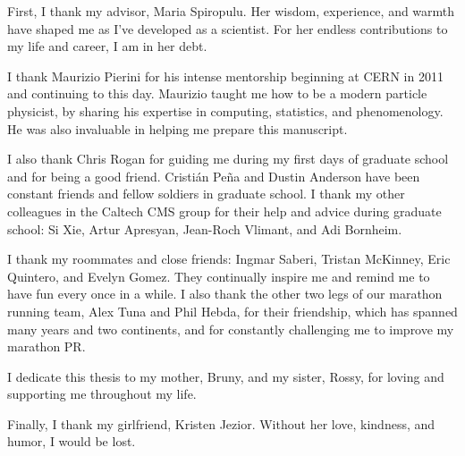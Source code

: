 \begin{acknowledgments}     %
                                                                                                         
First, I thank my advisor, Maria Spiropulu. Her
wisdom, experience, and warmth have shaped me as I've
developed as a scientist. For her endless contributions to my life
and career, I am in her debt.

I thank Maurizio Pierini for his intense mentorship beginning at CERN
in 2011 and continuing to this day. Maurizio taught me how to be a
modern particle physicist, by sharing his expertise in computing, statistics, and
phenomenology. He was also invaluable in helping me prepare this manuscript.

I also thank Chris Rogan for guiding me during my first days of
graduate school and for being a good friend. Cristi\'{a}n Pe\~{n}a and
Dustin Anderson have been constant friends and fellow soldiers in
graduate school. I thank my other colleagues in the Caltech CMS group
for their help and advice during graduate school: Si Xie, Artur
Apresyan, Jean-Roch Vlimant, and Adi Bornheim.

I thank my roommates and close friends: Ingmar Saberi, Tristan McKinney,
Eric Quintero, and Evelyn Gomez. They continually inspire me and
remind me to have fun every once in a while. 
I also thank the other two legs of our marathon running team, Alex Tuna and Phil Hebda, for their friendship,
which has spanned many years and two continents, and for constantly challenging
me to improve my marathon PR.

I dedicate this thesis to my mother, Bruny, and my sister, Rossy, for
loving and supporting me throughout my life.

Finally, I thank my girlfriend, Kristen Jezior. Without her love,
kindness, and humor, I would be lost.

\end{acknowledgments}